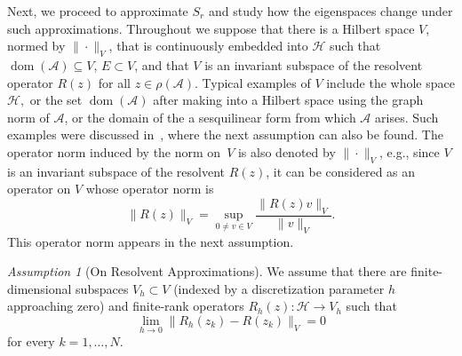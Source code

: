 \documentclass[12pt, oneside, reqno]{amsart}
\theoremstyle{remark}
\newtheorem{assumption}[theorem]{Assumption}
\DeclareMathOperator{\dom}{dom}
\newcommand{\Ac}{\mathcal{A}}
\newcommand{\Hc}{\mathcal{H}}
\begin{document}
\bigskip


Next, we proceed to approximate $S_r$ and study how the eigenspaces
change under such approximations. Throughout we suppose that there is a
Hilbert space $V$, normed by $\| \cdot \|_{V}$, that is continuously
embedded into $\Hc$ such that $\dom(\Ac ) \subseteq V$, $E \subset V$, and that $V$
is an invariant subspace of the resolvent operator $R(z)$ for all
$z \in \rho(\Ac)$. Typical
examples of $V$ include the whole space $\Hc,$ or the set $\dom (\Ac)$
after making into a Hilbert space using the graph norm of $\Ac$, or
the domain of the a sesquilinear form from which $\Ac$ arises. Such
examples were discussed in~\cite{GopGruOva2020-1}, where the next
assumption can also be found. 
The operator norm induced by the norm on~$V$ is also denoted by
$\| \cdot \|_V$, e.g., since $V$ is an invariant subspace of the resolvent
$R(z)$, it can be considered as an operator on $V$ whose operator norm is 
\[
  \| R(z) \|_V = \sup_{0 \ne v \in V} \frac{ \| R(z) v\|_V }{ \| v \|_V }.
\]
This operator  norm appears in the next assumption.

\begin{assumption}[On Resolvent Approximations]
  \label{asm:resolvent-approx}
  We assume that there are
  finite-dimensional subspaces $V_h \subset V$ (indexed by a
  discretization parameter $h$ approaching zero) and finite-rank
  operators $R_h(z) : \Hc \to V_h$ such that
  \begin{equation}
    \label{eq:1}
    \lim_{h \to 0} \| R_h(z_k) - R(z_k) \|_V = 0
  \end{equation}
  for every $k = 1, \dots, N.$
\end{assumption}
\end{document}
